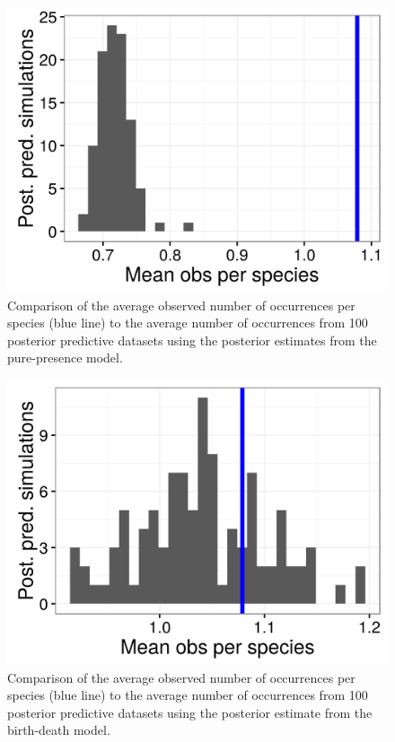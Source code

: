 \documentclass[12pt,letterpaper]{article}
\begin{document}
\begin{figure}[ht]
  \centering
  \includegraphics[width=\textwidth,height=0.4\textheight,keepaspectratio=true]{figure/pred_occ}
  \caption[Posterior predictive check for pure-presence model]{Comparison of the average observed number of occurrences per species (blue line) to the average number of occurrences from 100 posterior predictive datasets using the posterior estimates from the pure-presence model.}
  \label{fig:ppc_pure_presence}
\end{figure}

\begin{figure}[ht]
  \centering
  \includegraphics[width=\textwidth,height=0.4\textheight,keepaspectratio=true]{figure/pred_occ_bd}
  \caption[Posterior predictive check for birth-death model]{Comparison of the average observed number of occurrences per species (blue line) to the average number of occurrences from 100 posterior predictive datasets using the posterior estimate from the birth-death model.}
  \label{fig:ppc_birth_death}
\end{figure}
\end{document}
